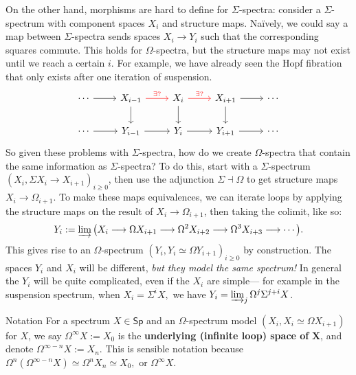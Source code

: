 On the other hand, morphisms are hard to define for $\Sigma$-spectra: consider a $\Sigma$-spectrum with component spaces $X_i $ and structure maps. Na\"ively, we could say a map between $\Sigma$-spectra sends spaces $X_i \to Y_i $ such that the corresponding squares commute. This holds for $\Omega$-spectra, but the structure maps may not exist until we reach a certain $i$. For example, we have already seen the Hopf fibration that only exists after one iteration of suspension.
\[
\begin{tikzcd}
    \cdots \arrow[r] &  X_{i-1}\arrow[d]\arrow[r,red,"\exists ?"] & X_i \arrow[d]\arrow[r,red,"\exists ?"] & X_{i+1} \arrow[d]\arrow[r]&\cdots \\
    \cdots \arrow[r]&Y_{i-1} \arrow[r] & Y_i \arrow[r] & Y_{i+1}\arrow[r]&\cdots 
\end{tikzcd}
\] So given these problems with $\Sigma$-spectra, how do we create $\Omega$-spectra that contain the same information as $\Sigma$-spectra? To do this, start with a $\Sigma$-spectrum $\left( X_i ,\Sigma X_i  \to X_{i+1} \right) _{i\geq 0}$, then use the adjunction $\Sigma \dashv \Omega$ to get structure maps $X_i \to \Omega_{i+1}$. To make these maps equivalences, we can iterate loops by applying the structure maps on the result of $X_i \to \Omega _{i+1}$, then taking the colimit, like so: \[
Y _i :=\varinjlim \big( X_i  \longrightarrow \Omega X_{i+1} \longrightarrow\Omega^2 X_{i+2}\longrightarrow \Omega ^3 X_{i+3}\longrightarrow\cdots  \big) .
\] This gives rise to an $\Omega$-spectrum $\left( Y_i , Y_i \simeq \Omega Y_{i+1} \right) _{i\geq 0}$ by construction. The spaces $Y_i $ and $X_i $ will be different, \textit{but they model the same spectrum!} In general the $Y_i $ will be quite complicated, even if the $X_i $ are simple--- for example in the suspension spectrum, when $X_i =\Sigma ^i X,$ we have $Y_i =\varinjlim_j \Omega^j \Sigma ^{j+i}X$.

\begin{namedthing}{Notation} 
    For a spectrum $X\in\mathsf{Sp} $ and an $\Omega$-spectrum model $(X_i ,X_i \simeq \Omega X_{i+1})$ for $X$, we say $\Omega^{\infty}X:=X_0$ is the \textbf{underlying (infinite loop) space of} $\mathbf X$, and denote $\Omega ^{\infty-n}X:= X_n $. This is sensible notation because $\Omega^n (\Omega ^{\infty-n}X)\simeq \Omega ^n X_n \simeq X_0,$ or $\Omega ^{\infty}X$.
\end{namedthing}

